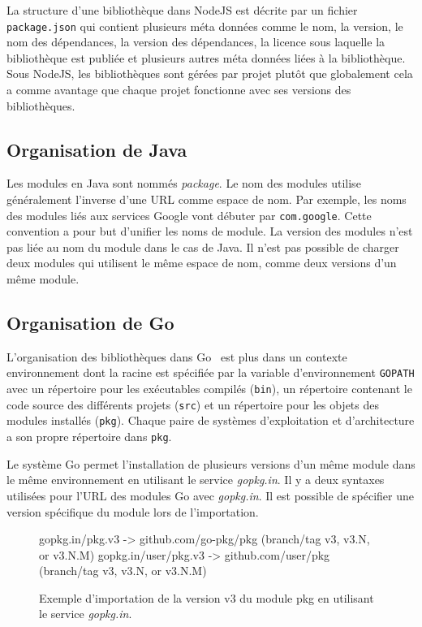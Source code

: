 La structure d'une bibliothèque dans NodeJS est décrite par un fichier
\texttt{package.json} qui contient plusieurs méta données comme
le nom, la version, le nom des dépendances, la version des dépendances,
la licence sous laquelle la bibliothèque est publiée et plusieurs autres
méta données liées à la bibliothèque. Sous NodeJS, les bibliothèques sont gérées
par projet plutôt que globalement cela a comme avantage que chaque projet
fonctionne avec ses versions des bibliothèques.

\subsection{Organisation de Java}
%
Les modules en Java sont nommés \textit{package}.  Le nom des modules utilise
généralement l'inverse d'une URL comme espace de nom. Par exemple, les noms des
modules liés aux services Google vont débuter par \texttt{com.google}. Cette
convention a pour but d'unifier les noms de module. La version des modules
n'est pas liée au nom du module dans le cas de Java. Il n'est pas possible de
charger deux modules qui utilisent le même espace de nom, comme deux versions
d'un même module.

\subsection{Organisation de Go}
%
L'organisation des bibliothèques dans Go~\cite{GoLang} est plus dans un contexte
environnement dont la racine est spécifiée par la variable d'environnement
\texttt{GOPATH} avec un répertoire pour les exécutables compilés
(\texttt{bin}), un répertoire contenant le code source des différents projets
(\texttt{src}) et un répertoire pour les objets des modules installés
(\texttt{pkg}). Chaque paire de systèmes d'exploitation et d'architecture a son
propre répertoire dans \texttt{pkg}.

Le système Go permet l'installation de plusieurs versions d'un même module dans
le même environnement en utilisant le service \textit{gopkg.in}. Il y a deux
syntaxes utilisées pour l'URL des modules Go avec \textit{gopkg.in}. Il est possible
de spécifier une version spécifique du module lors de l'importation.

\noindent
\begin{figure}[ht]
  \centering
\begin{mplisting}{1}
gopkg.in/pkg.v3      -> github.com/go-pkg/pkg (branch/tag v3, v3.N, or v3.N.M)
gopkg.in/user/pkg.v3 -> github.com/user/pkg   (branch/tag v3, v3.N, or v3.N.M)
\end{mplisting}
  \caption{Exemple d'importation de la version v3 du module pkg en utilisant
    le service \textit{gopkg.in}.}
  \label{fig:gopkg_import}
\end{figure}

